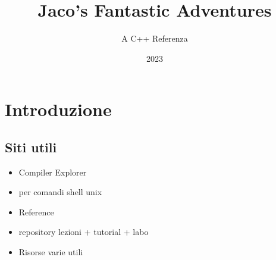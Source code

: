 \documentclass[10pt, oneside]{Book}
\title{Jaco's Fantastic Adventures}
\author{A C++ Referenza}
\date{2023}
\begin{document}
\maketitle

\tableofcontents

\chapter{Introduzione}

\section{Siti utili}
\begin{itemize}
\item {} Compiler Explorer
\item {} per comandi shell unix
\item {} Reference
\item {} repository lezioni + tutorial + labo
\item {} Risorse varie utili
\end{itemize}
\end{document}

